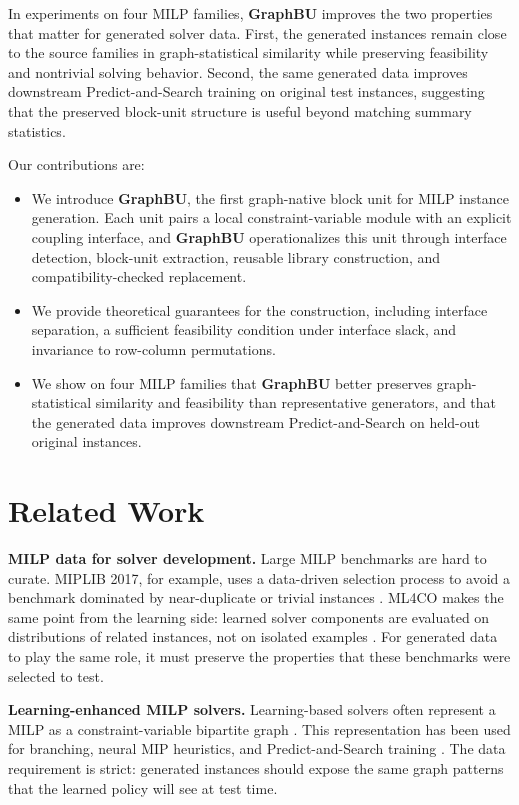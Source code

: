 \documentclass[letterpaper]{article}
\newcommand{\method}{\textbf{GraphBU}\xspace}
\begin{document}
In experiments on four MILP families, \method improves the two properties that matter for generated solver data. First, the generated instances remain close to the source families in graph-statistical similarity while preserving feasibility and nontrivial solving behavior. Second, the same generated data improves downstream Predict-and-Search training on original test instances, suggesting that the preserved block-unit structure is useful beyond matching summary statistics.

Our contributions are:
\begin{itemize}
\item We introduce \method, the first graph-native block unit for MILP instance generation. Each unit pairs a local constraint-variable module with an explicit coupling interface, and \method operationalizes this unit through interface detection, block-unit extraction, reusable library construction, and compatibility-checked replacement.
\item We provide theoretical guarantees for the construction, including interface separation, a sufficient feasibility condition under interface slack, and invariance to row-column permutations.
\item We show on four MILP families that \method better preserves graph-statistical similarity and feasibility than representative generators, and that the generated data improves downstream Predict-and-Search on held-out original instances.
\end{itemize}

\section{Related Work}

\textbf{MILP data for solver development.}
Large MILP benchmarks are hard to curate. MIPLIB 2017, for example, uses a data-driven selection process to avoid a benchmark dominated by near-duplicate or trivial instances \cite{miplib2017}. ML4CO makes the same point from the learning side: learned solver components are evaluated on distributions of related instances, not on isolated examples \cite{gasse2022ml4co}. For generated data to play the same role, it must preserve the properties that these benchmarks were selected to test.

\textbf{Learning-enhanced MILP solvers.}
Learning-based solvers often represent a MILP as a constraint-variable bipartite graph \cite{gasse2019exact,prouvost2020ecole}. This representation has been used for branching, neural MIP heuristics, and Predict-and-Search training \cite{khalil2016learning,nair2020neuralmip,han2023predictsearch}. The data requirement is strict: generated instances should expose the same graph patterns that the learned policy will see at test time.
\end{document}
